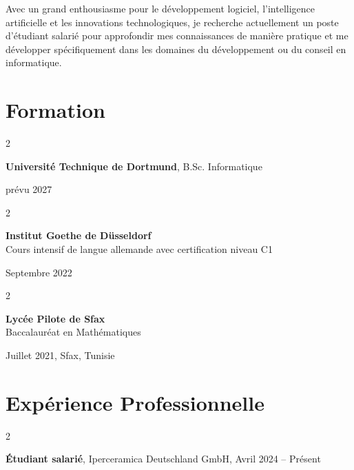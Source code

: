 \documentclass[10pt, letterpaper]{article}
\newenvironment{twocolentry}[2][]{
    \onecolentry
    \def\secondColumn{#2}
    \setcolumnwidth{\fill, 4.5 cm}
    \begin{paracol}{2}
}{
    \switchcolumn \raggedleft \secondColumn
    \end{paracol}
    \endonecolentry
} %
\begin{document}
Avec un grand enthousiasme pour le développement logiciel, l'intelligence artificielle et les innovations technologiques, je recherche actuellement un poste d'étudiant salarié pour approfondir mes connaissances de manière pratique et me développer spécifiquement dans les domaines du développement ou du conseil en informatique.

\section{Formation}

\begin{twocolentry}{
      prévu 2027
}
    \textbf{Université Technique de Dortmund}, B.Sc. Informatique

    \vspace{0.10 cm}
   
        
       \end{twocolentry}
             
             
\vspace{0.2 cm}
\begin{twocolentry}{
    Septembre 2022
}
    \textbf{Institut Goethe de Düsseldorf} \\
   Cours intensif de langue allemande avec certification niveau C1 
\end{twocolentry}
\vspace{0.2cm}

\begin{twocolentry}{
    Juillet 2021, Sfax, Tunisie}

    \textbf{Lycée Pilote de Sfax}\\

   
     
             Baccalauréat en Mathématiques 


\end{twocolentry}

    
    \section{Expérience Professionnelle}
        
        \begin{twocolentry}{
            Avril 2024 – Présent 
        }
            \textbf{Étudiant salarié}, Iperceramica Deutschland GmbH, \end{twocolentry}
\end{document}
